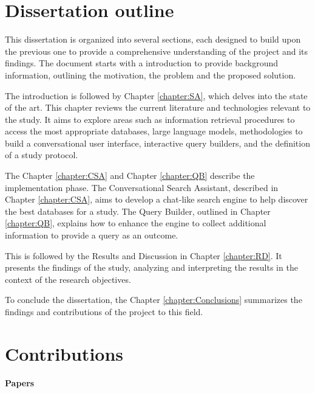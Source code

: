 \section{Dissertation outline}


This dissertation is organized into several sections, each designed to build upon the previous one to provide a comprehensive understanding of the project and its findings. The document starts with a introduction to provide background information, outlining the motivation, the problem and the proposed solution.

The introduction is followed by Chapter \ref{chapter:SA}, which delves into the state of the art. This chapter reviews the current literature and technologies relevant to the study. It aims to explore areas such as information retrieval procedures to access the most appropriate databases, large language models, methodologies to build a conversational user interface, interactive query builders, and the definition of a study protocol.

The Chapter \ref{chapter:CSA} and Chapter \ref{chapter:QB} describe the implementation phase. The Conversational Search Assistant, described in Chapter \ref{chapter:CSA}, aims to develop a chat-like search engine to help discover the best databases for a study. The Query Builder, outlined in Chapter \ref{chapter:QB}, explains how to enhance the engine to collect additional information to provide a query as an outcome.

This is followed by the Results and Discussion in Chapter \ref{chapter:RD}. It presents the findings of the study, analyzing and interpreting the results in the context of the research objectives.

To conclude the dissertation, the Chapter \ref{chapter:Conclusions} summarizes the findings and contributions of the project to this field.


\section{Contributions}

\noindent \textbf{Papers}

